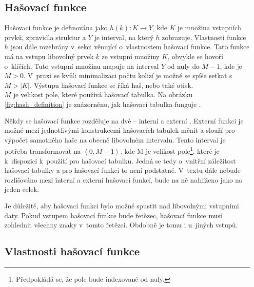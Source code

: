 \subsection*{Hašovací funkce}
Hašovací funkce je definována jako $h(k): K \rightarrow Y $, kde $K$ je množina vstupních prvků, zpravidla struktur a $Y$ je interval, na který $h$ zobrazuje. Vlastnosti funkce $h$ jsou dále rozebrány v~sekci věnující o~vlastnostem hašovací funkce. Tato funkce má na vstupu libovolný prvek $k$ ze vstupní množiny $K$, obvykle se hovoří o~klíčích. Tuto vstupní množinu mapuje na interval $Y$ od nuly do $M-1$, kde je $M > 0$. V~praxi se kvůli minimalizaci počtu kolizí je možné se spíše setkat s~$M > |K|$. Výstupu hašovací funkce se říká haš, nebo také otisk.\\ $M$ je velikost pole, které používá hašovací tabulka. Na obrázku \ref{fig:hash_definition} je znázorněno, jak hašovací tabulka funguje \cite{knn}.

Někdy se hašovací funkce rozděluje na dvě -- interní a externí \cite{hashtablebench}. Externí funkci je možné mezi jednotlivými konstrukcemi hašovacích tabulek měnit a slouží pro výpočet samotného haše na obecně libovolném intervalu. Tento interval je potřeba transformovat na $\left< 0,M-1 \right>$, kde M je velikost pole\footnote{Předpokládá se, že pole bude indexované od nuly.}, které je k~dispozici k~použití pro hašovací tabulku. Jedná se tedy o~vnitřní záležitost hašovací tabulky a pro hašovací funkci to není podstatné. 
V~textu dále nebude rozlišováno mezi interní a externí hašovací funkcí, bude na ně nahlíženo jako na jeden celek.

Je důležité, aby hašovací funkci bylo možné spustit nad libovolnými vstupními daty. Pokud vstupem hašovací funkce bude řetězec, hašovací funkce musí zohlednit všechny znaky v~tomto řetězci. Obdobně je tomu i u~jiných vstupů.

\subsection*{Vlastnosti hašovací funkce}
\label{char_hash_function}

